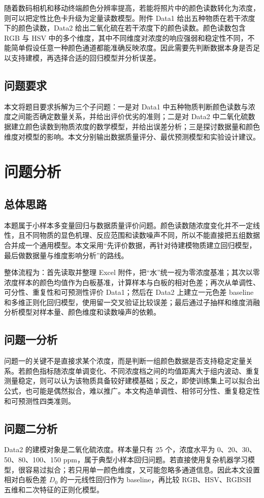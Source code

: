 \documentclass[UTF8,a4paper,12pt]{ctexart}
\begin{document}
随着数码相机和移动终端颜色分辨率提高，若能将照片中的颜色读数转化为浓度，则可以把定性比色卡升级为定量读数模型。附件 Data1 给出五种物质在若干浓度下的颜色读数，Data2 给出二氧化硫在若干浓度下的颜色读数。颜色读数包含 RGB 与 HSV 中的多个维度，其中不同维度对浓度的响应强弱和稳定性不同，不能简单假设任意一种颜色通道都能准确反映浓度。因此需要先判断数据本身是否足以支持建模，再选择合适的回归模型并分析误差。
\subsection{问题要求}
本文将题目要求拆解为三个子问题：一是对 Data1 中五种物质判断颜色读数与浓度之间能否确定数量关系，并给出评价优劣的准则；二是对 Data2 中二氧化硫数据建立颜色读数到物质浓度的数学模型，并给出误差分析；三是探讨数据量和颜色维度对模型的影响。本文分别输出数据质量评分、最优预测模型和实验设计建议。
\section{问题分析}
\subsection{总体思路}
本题属于小样本多变量回归与数据质量评价问题。颜色读数随浓度变化并不一定线性，且不同物质的显色机理、反应范围和读数噪声不同，所以不能直接把五组数据合并成一个通用模型。本文采用“先评价数据，再针对待建模物质建立回归模型，最后做数据量与维度影响分析”的路线。

整体流程为：首先读取并整理 Excel 附件，把“水”统一视为零浓度基准；其次以零浓度样本的颜色均值作为白板基准，计算样本与白板的相对色差；再次从单调性、可分性、重复性和可预测性评价 Data1；然后在 Data2 上建立一元色差 baseline 和多维正则化回归模型，使用留一交叉验证比较误差；最后通过子抽样和维度消融分析模型对样本量、颜色维度和读数噪声的依赖。
\subsection{问题一分析}
问题一的关键不是直接求某个浓度，而是判断一组颜色数据是否支持稳定定量关系。若颜色指标随浓度单调变化、不同浓度档之间的均值距离大于组内波动、重复测量稳定，则可以认为该物质具备较好建模基础；反之，即使训练集上可以拟合出公式，也可能是偶然拟合，难以推广。本文构造单调性、相邻可分性、重复稳定性和可预测性四类准则。
\subsection{问题二分析}
Data2 的建模对象是二氧化硫浓度。样本量只有 25 个，浓度水平为 0、20、30、50、80、100、150 ppm，属于典型小样本回归问题。若直接使用复杂机器学习模型，很容易过拟合；若只用单一颜色维度，又可能忽略多通道信息。因此本文设置相对白板色差 $D_0$ 的一元线性回归作为 baseline，再比较 RGB、HSV、RGBSH 五维和二次特征的正则化模型。
\end{document}
